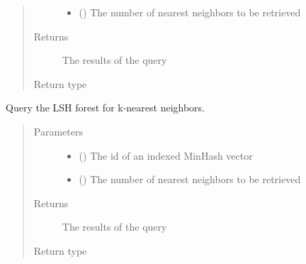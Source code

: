 \documentclass[letterpaper,10pt,english]{sphinxmanual}
\begin{document}
\begin{fulllineitems}
\begin{fulllineitems}
\begin{quote}
\begin{description}
\begin{itemize}
\item {} 
 () \textendash{} The number of nearest neighbors to be retrieved

\end{itemize}

\item[{Returns}] \leavevmode
The results of the query

\item[{Return type}] \leavevmode
{}

\end{description}\end{quote}

\end{fulllineitems}


\begin{fulllineitems}
\label{\detokenize{documentation:tmap.LSHForest.query_by_id}}
Query the LSH forest for k-nearest neighbors.
\begin{quote}\begin{description}
\item[{Parameters}] \leavevmode\begin{itemize}
\item {} 
 () \textendash{} The id of an indexed MinHash vector

\item {} 
 () \textendash{} The number of nearest neighbors to be retrieved

\end{itemize}

\item[{Returns}] \leavevmode
The results of the query

\item[{Return type}] \leavevmode
{}

\end{description}\end{quote}

\end{fulllineitems}


\end{fulllineitems}
\end{document}
